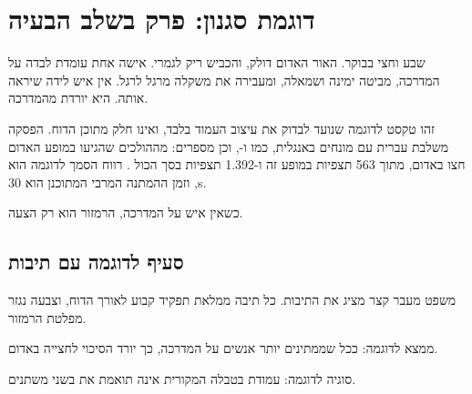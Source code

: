
\chapter{דוגמת סגנון: פרק בשלב הבעיה}
\begin{scenebox}
שבע וחצי בבוקר. האור האדום דולק, והכביש ריק לגמרי. אישה אחת עומדת לבדה על המדרכה,
מביטה ימינה ושמאלה, ומעבירה את משקלה מרגל לרגל. אין איש לידה שיראה אותה.
היא יורדת מהמדרכה.
\end{scenebox}

זהו טקסט לדוגמה שנועד לבדוק את עיצוב העמוד בלבד, ואינו חלק מתוכן הדוח.
הפסקה משלבת עברית עם מונחים באנגלית, כמו  ו-,
וכן מספרים:  מההולכים שהגיעו במופע האדום חצו באדום, מתוך \num{563} תצפיות במופע זה
ו-\num{1,392} תצפיות בסך הכול \cite{rosenbloom2009}. רווח הסמך לדוגמה הוא ,
וזמן ההמתנה המרבי המתוכנן הוא \unit{30}{s}.

\begin{statrow}[3]
\end{statrow}

\begin{pullquote}
כשאין איש על המדרכה, הרמזור הוא רק הצעה.
\end{pullquote}

\section{סעיף לדוגמה עם תיבות}
משפט מעבר קצר מציג את התיבות. כל תיבה ממלאת תפקיד קבוע לאורך הדוח, וצבעה נגזר מפלטת הרמזור.

\begin{findingbox}
ממצא לדוגמה: ככל שממתינים יותר אנשים על המדרכה, כך יורד הסיכוי לחצייה באדום.
\end{findingbox}

\begin{cautionbox}
סוגיה לדוגמה: עמודת  בטבלה המקורית אינה תואמת את  בשני משתנים.
\end{cautionbox}

